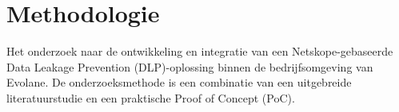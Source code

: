 
\section{Methodologie}%
\label{sec:methodologie}

Het onderzoek naar de ontwikkeling en integratie van een Netskope-gebaseerde Data Leakage Prevention (DLP)-oplossing binnen 
de bedrijfsomgeving van Evolane. De onderzoeksmethode is een combinatie van een uitgebreide literatuurstudie en een praktische Proof of Concept (PoC).





